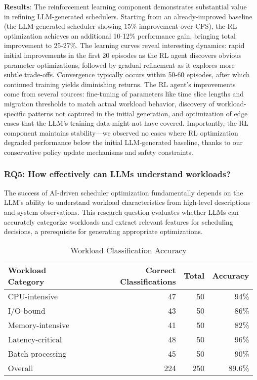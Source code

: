 \textbf{Results}: The reinforcement learning component demonstrates substantial value in refining LLM-generated schedulers. Starting from an already-improved baseline (the LLM-generated scheduler showing 15\% improvement over CFS), the RL optimization achieves an additional 10-12\% performance gain, bringing total improvement to 25-27\%. The learning curves reveal interesting dynamics: rapid initial improvements in the first 20 episodes as the RL agent discovers obvious parameter optimizations, followed by gradual refinement as it explores more subtle trade-offs. Convergence typically occurs within 50-60 episodes, after which continued training yields diminishing returns. The RL agent's improvements come from several sources: fine-tuning of parameters like time slice lengths and migration thresholds to match actual workload behavior, discovery of workload-specific patterns not captured in the initial generation, and optimization of edge cases that the LLM's training data might not have covered. Importantly, the RL component maintains stability—we observed no cases where RL optimization degraded performance below the initial LLM-generated baseline, thanks to our conservative policy update mechanisms and safety constraints.

\subsubsection{RQ5: How effectively can LLMs understand workloads?}

The success of AI-driven scheduler optimization fundamentally depends on the LLM's ability to understand workload characteristics from high-level descriptions and system observations. This research question evaluates whether LLMs can accurately categorize workloads and extract relevant features for scheduling decisions, a prerequisite for generating appropriate optimizations.

\begin{table}[h]
\caption{Workload Classification Accuracy}
\label{tab:workload-understanding}
\begin{tabular}{lrrr}
\toprule
Workload Category & Correct Classifications & Total & Accuracy \\
\midrule
CPU-intensive & 47 & 50 & 94\% \\
I/O-bound & 43 & 50 & 86\% \\
Memory-intensive & 41 & 50 & 82\% \\
Latency-critical & 48 & 50 & 96\% \\
Batch processing & 45 & 50 & 90\% \\
\midrule
Overall & 224 & 250 & 89.6\% \\
\bottomrule
\end{tabular}
\end{table}

